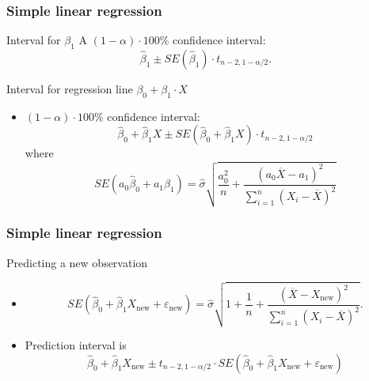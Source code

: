 \documentclass[handout]{beamer}
\begin{document}

   \begin{frame} \frametitle{Simple linear regression}

   \begin{block}
   {Interval for $\beta_1$}
   A $(1-\alpha) \cdot 100 \%$ confidence interval:
   $$
   \widehat{\beta}_1 \pm SE(\widehat{\beta}_1) \cdot t_{n-2, 1-\alpha/2}.$$


   \end{block}

   \begin{block}
   {Interval for regression line $\beta_0 + \beta_1 \cdot X$}
   \begin{itemize}[<+->]

   \item $(1-\alpha) \cdot 100 \%$ confidence interval:
   $$
   \widehat{\beta}_0 + \widehat{\beta}_1 X \pm SE(\widehat{\beta}_0 + \widehat{\beta}_1 X) \cdot t_{n-2, 1-\alpha/2}$$
   where $$
   SE(a_0\widehat{\beta}_0 + a_1\widehat{\beta}_1) = \widehat{\sigma} \sqrt{\frac{a_0^2}{n} + \frac{(a_0\overline{X} - a_1)^2}{\sum_{i=1}^n \left(X_i-\overline{X}\right)^2}}$$
   \end{itemize}

   \end{block}
   \end{frame}


   \begin{frame} \frametitle{Simple linear regression}

   \begin{block}
   {Predicting a new observation}
   \begin{itemize}[<+->]

   \item
   $$
   SE(\widehat{\beta}_0 + \widehat{\beta}_1 X_{\text{new}} + \varepsilon_{\text{new}}) = \widehat{\sigma} \sqrt{1 + \frac{1}{n} + \frac{(\overline{X} - X_{\text{new}})^2}{\sum_{i=1}^n \left(X_i-\overline{X}\right)^2}}.$$

   \item Prediction interval  is
   $$ \widehat{\beta}_0 +  \widehat{\beta}_1 X_{\text{new}} \pm t_{n-2, 1-\alpha/2} \cdot SE(\widehat{\beta}_0 + \widehat{\beta}_1 X_{\text{new}} + \varepsilon_{\text{new}})
   $$
   \end{itemize}
   \end{block}
   \end{frame}
\end{document}
